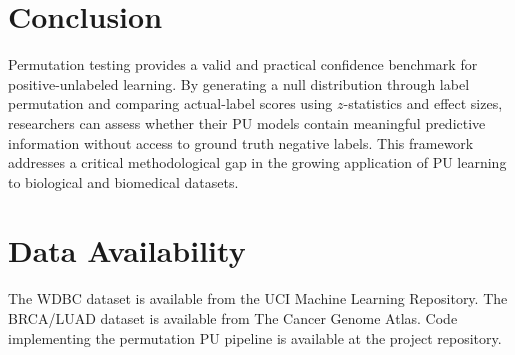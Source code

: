 \documentclass[12pt]{article}
\begin{document}
\section{Conclusion}

Permutation testing provides a valid and practical confidence benchmark for positive-unlabeled learning. By generating a null distribution through label permutation and comparing actual-label scores using $z$-statistics and effect sizes, researchers can assess whether their PU models contain meaningful predictive information without access to ground truth negative labels. This framework addresses a critical methodological gap in the growing application of PU learning to biological and biomedical datasets.

\section*{Data Availability}

The WDBC dataset is available from the UCI Machine Learning Repository. The BRCA/LUAD dataset is available from The Cancer Genome Atlas. Code implementing the permutation PU pipeline is available at the project repository.



\end{document}
